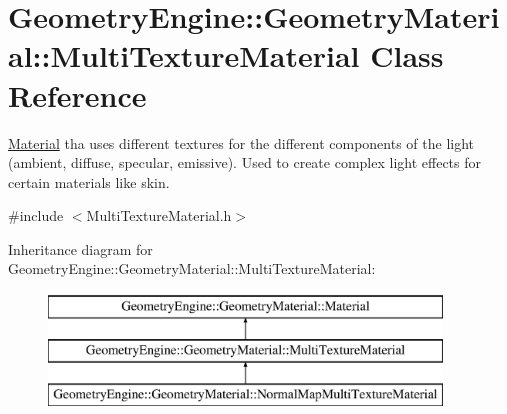 \hypertarget{class_geometry_engine_1_1_geometry_material_1_1_multi_texture_material}{}\section{Geometry\+Engine\+::Geometry\+Material\+::Multi\+Texture\+Material Class Reference}
\label{class_geometry_engine_1_1_geometry_material_1_1_multi_texture_material}


\mbox{\hyperlink{class_geometry_engine_1_1_geometry_material_1_1_material}{Material}} tha uses different textures for the different components of the light (ambient, diffuse, specular, emissive). Used to create complex light effects for certain materials like skin.  




{\ttfamily \#include $<$Multi\+Texture\+Material.\+h$>$}

Inheritance diagram for Geometry\+Engine\+::Geometry\+Material\+::Multi\+Texture\+Material\+:\begin{figure}[H]
\begin{center}
\leavevmode
\includegraphics[height=3.000000cm]{class_geometry_engine_1_1_geometry_material_1_1_multi_texture_material}
\end{center}
\end{figure}
